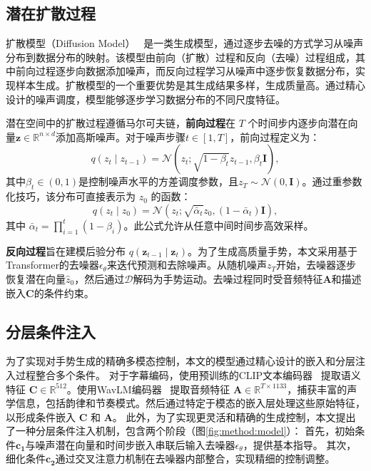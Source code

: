 \subsection{潜在扩散过程}
扩散模型（Diffusion Model）~\cite{ho2020ddpm} 是一类生成模型，通过逐步去噪的方式学习从噪声分布到数据分布的映射。该模型由前向（扩散）过程和反向（去噪）过程组成，其中前向过程逐步向数据添加噪声，而反向过程学习从噪声中逐步恢复数据分布，实现样本生成。扩散模型的一个重要优势是其生成结果多样，生成质量高。通过精心设计的噪声调度，模型能够逐步学习数据分布的不同尺度特征。

潜在空间中的扩散过程遵循马尔可夫链，\textbf{前向过程}在 $T$ 个时间步内逐步向潜在向量$\mathbf{z} \in \mathbb{R}^{n\times d}$添加高斯噪声。对于噪声步骤$t \in [1,T]$，前向过程定义为：
\begin{equation}
    q(z_t \mid z_{t-1}) = \mathcal{N}(z_t; \sqrt{1 - \beta_t} z_{t-1}, \beta_t \mathbf{I}),
  \end{equation}
其中$\beta_t \in (0,1)$是控制噪声水平的方差调度参数，且$z_T \sim \mathcal{N}(0, \mathbf{I})$。通过重参数化技巧，该分布可直接表示为 $z_0$ 的函数：
\begin{equation}
  q(z_t \mid z_0) = \mathcal{N}(z_t; \sqrt{\bar{\alpha}_t} z_0, (1 - \bar{\alpha}_t) \mathbf{I}),
\end{equation}
其中 $\bar{\alpha}_t = \prod_{i=1}^{t} (1 - \beta_i)$。此公式允许从任意中间时间步高效采样。

\textbf{反向过程}旨在建模后验分布 $q(\mathbf{z}_{t-1} \mid \mathbf{z}_t)$。为了生成高质量手势，本文采用基于Transformer的去噪器$\epsilon_\theta$来迭代预测和去除噪声。从随机噪声$z_T$开始，去噪器逐步恢复潜在向量$\hat{z}_0$，然后通过$\mathcal{D}$解码为手势运动。去噪过程同时受音频特征$\mathbf{A}$和描述嵌入$\mathbf{C}$的条件约束。

\subsection{分层条件注入}
为了实现对手势生成的精确多模态控制，本文的模型通过精心设计的嵌入和分层注入过程整合多个条件。
对于字幕编码，使用预训练的CLIP文本编码器~\cite{radford2021clip} 提取语义特征 $\mathbf{C} \in \mathbb{R}^{512}$。使用WavLM编码器~\cite{chen2022wavlm} 提取音频特征 $\mathbf{A} \in \mathbb{R}^{T\times1133}$，捕获丰富的声学信息，包括韵律和节奏模式。然后通过特定于模态的嵌入层处理这些原始特征，以形成条件嵌入 $\mathbf{C}$ 和 $\mathbf{A}$。
此外，为了实现更灵活和精确的生成控制，本文提出了一种分层条件注入机制，包含两个阶段（图\ref{fig:method:model}）：
首先，初始条件$\mathbf{c_1}$与噪声潜在向量和时间步嵌入串联后输入去噪器$\epsilon_\theta$，提供基本指导。
其次，细化条件$\mathbf{c_2}$通过交叉注意力机制在去噪器内部整合，实现精细的控制调整。

